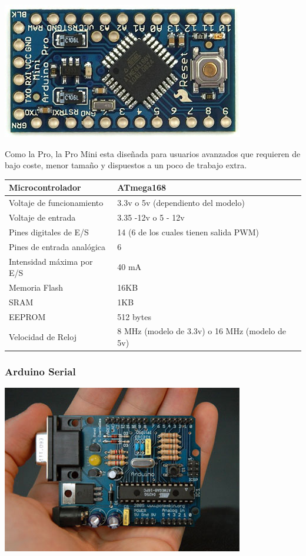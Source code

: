 \documentclass[12pt,a4paper]{report}
\begin{document}
\includegraphics[scale=0.6]{ArduinoProMini.jpg}

Como la Pro, la Pro Mini esta diseñada para usuarios avanzados que requieren de
bajo coste, menor tamaño y dispuestos a un poco de trabajo extra. 

\begin{tabular}{||l | l ||}
\hline
\hline
Microcontrolador & ATmega168\\
\hline
Voltaje de funcionamiento & 3.3v o 5v (dependiento del modelo)\\
\hline
Voltaje de entrada & 3.35 -12v o 5 - 12v\\
\hline
Pines digitales de E/S & 14 (6 de los cuales tienen salida PWM)\\
\hline
Pines de entrada analógica & 6\\
\hline
Intensidad máxima por E/S & 40 mA\\
\hline
Memoria Flash & 16KB\\
\hline
SRAM & 1KB\\
\hline
EEPROM & 512 bytes\\
\hline
Velocidad de Reloj & 8 MHz (modelo de 3.3v) o 16 MHz (modelo de 5v)\\
\hline
\hline
\end{tabular}

\subsubsection{Arduino Serial}

\includegraphics[scale=0.6]{arduino.jpg}
\end{document}
